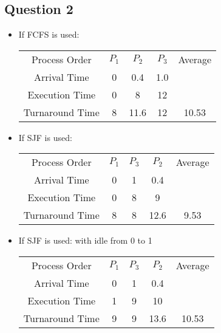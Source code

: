 \documentclass{article}
\begin{document}
\subsection*{Question 2}
\begin{itemize}
    \item If FCFS is used:
          \begin{tabular}{ccccc}
              Process Order   & \(P_1\) & \(P_2\) & \(P_3\) & Average \\
              Arrival Time    & 0       & 0.4     & 1.0               \\
              Execution Time  & 0       & 8       & 12                \\
              Turnaround Time & 8       & 11.6    & 12      & 10.53   \\
          \end{tabular}
    \item If SJF is used:
          \begin{tabular}{ccccc}
              Process      Order & \(P_1\) & \(P_3\) & \(P_2\) & Average \\
              Arrival Time       & 0       & 1       & 0.4               \\
              Execution Time     & 0       & 8       & 9                 \\
              Turnaround Time    & 8       & 8       & 12.6    & 9.53    \\
          \end{tabular}
    \item If SJF is used: with idle from 0 to 1
          \begin{tabular}{ccccc}
              Process      Order & \(P_1\) & \(P_3\) & \(P_2\) & Average \\
              Arrival Time       & 0       & 1       & 0.4               \\
              Execution Time     & 1       & 9       & 10                \\
              Turnaround Time    & 9       & 9       & 13.6    & 10.53   \\
          \end{tabular}
\end{itemize}
\end{document}
